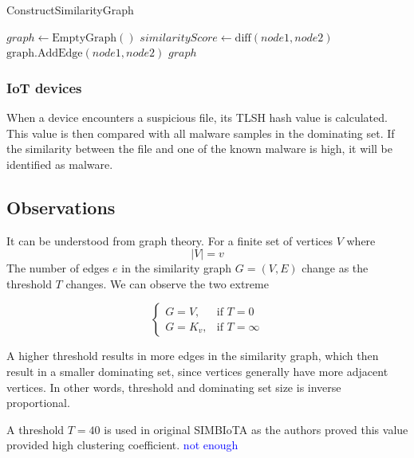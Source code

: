 \documentclass[
	a4paper, %
	10pt, %
	unnumberedsections, %
	twoside, %
]{LTJournalArticle}
\begin{document}
\begin{algorithm}
\caption{ConstructSimilarityGraph}\label{alg:construct_similarity_graph}
\begin{algorithmic}[1]
    \State $graph \gets \text{EmptyGraph}()$
            \State $similarityScore \gets \text{diff}(node1, node2)$
                \State $\text{graph.AddEdge}(node1, node2)$
            \EndIf
        \EndFor
    \EndFor
    \State \Return $graph$
\EndFunction
\end{algorithmic}
\end{algorithm}

\subsubsection{IoT devices}
When a device encounters a suspicious file, its TLSH hash value is calculated. This value is then compared with all malware samples in the dominating set. If the similarity between the file and one of the known malware is high, it will be identified as malware.

\subsection{Observations}
It can be understood from graph theory. For a finite set of vertices $V$ where
\begin{equation}
    \lvert V \rvert = v
\end{equation}
The number of edges $e$ in the similarity graph $G=(V,E)$ change as the threshold $T$ changes.
We can observe the two extreme

\begin{equation}
    \begin{cases}
    G = V,   & \text{if } T=0 \\
    G = K_v, & \text{if } T=\infty
    \end{cases}
\end{equation}


A higher threshold results in more edges in the similarity graph, which then result in a smaller dominating set, since vertices generally have more adjacent vertices. In other words, threshold and dominating set size is inverse proportional.

A threshold $T=40$ is used in original SIMBIoTA as the authors proved this value provided high clustering coefficient.\autocite{9914145}
\textcolor{blue}{not enough}
\end{document}
